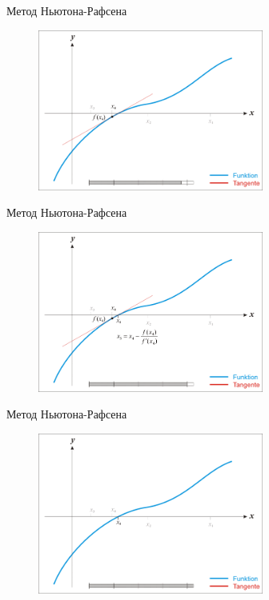 \documentclass[10pt]{beamer}
\begin{document}
\begin{frame}{Метод Ньютона-Рафсена}
	\begin{figure}[htbp]
	  \includegraphics[height=150pt, keepaspectratio = true]{images/newton-15}   
	\end{figure}
\end{frame}

\begin{frame}{Метод Ньютона-Рафсена}
	\begin{figure}[htbp]
	  \includegraphics[height=150pt, keepaspectratio = true]{images/newton-16}   
	\end{figure}
\end{frame}

\begin{frame}{Метод Ньютона-Рафсена}
	\begin{figure}[htbp]
	  \includegraphics[height=150pt, keepaspectratio = true]{images/newton-17}   
	\end{figure}
\end{frame}
\end{document}
